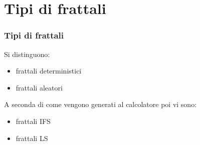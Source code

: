 \documentclass{beamer}
\begin{document}
	\section{Tipi di frattali}
		\begin{frame}
			\frametitle{Tipi di frattali}
			Si distinguono:
			\begin{itemize}
				\item frattali deterministici
				\item frattali aleatori
			\end{itemize}
			\bigskip
			A seconda di come vengono generati al calcolatore poi vi sono:
			\begin{itemize}
				\item frattali IFS
				\item frattali LS
			\end{itemize}
		\end{frame}
\end{document}
